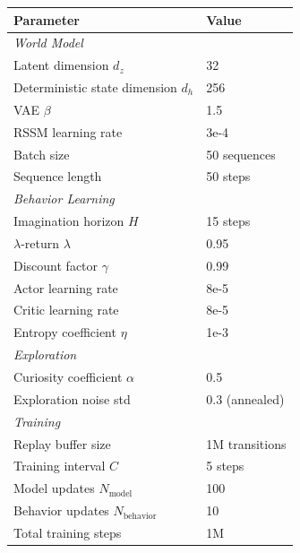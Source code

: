 \begin{table}
\centering


\begin{tabular}{@{}ll@{}}
\toprule
\textbf{Parameter} & \textbf{Value} \\
\midrule
\multicolumn{2}{l}{\textit{World Model}} \\
Latent dimension \(d_z\) & 32 \\
Deterministic state dimension \(d_h\) & 256 \\
VAE \(\beta\) & 1.5 \\
RSSM learning rate & 3e-4 \\
Batch size & 50 sequences \\
Sequence length & 50 steps \\
\midrule
\multicolumn{2}{l}{\textit{Behavior Learning}} \\
Imagination horizon \(H\) & 15 steps \\
\(\lambda\)-return \(\lambda\) & 0.95 \\
Discount factor \(\gamma\) & 0.99 \\
Actor learning rate & 8e-5 \\
Critic learning rate & 8e-5 \\
Entropy coefficient \(\eta\) & 1e-3 \\
\midrule
\multicolumn{2}{l}{\textit{Exploration}} \\
Curiosity coefficient \(\alpha\) & 0.5 \\
Exploration noise std & 0.3 (annealed) \\
\midrule
\multicolumn{2}{l}{\textit{Training}} \\
Replay buffer size & 1M transitions \\
Training interval \(C\) & 5 steps \\
Model updates \(N_{\text{model}}\) & 100 \\
Behavior updates \(N_{\text{behavior}}\) & 10 \\
Total training steps & 1M \\
\bottomrule
\end{tabular}
\end{table}